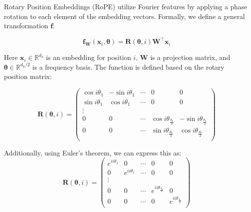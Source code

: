 \documentclass{article}
\begin{document}
Rotary Position Embeddings (RoPE) \citep{su2024roformer} utilize Fourier features by applying a phase rotation to each element of the embedding vectors. Formally, we define a general transformation $\mathbf{f}$:


\begin{equation}
\mathbf{f}_\mathbf{W}(\mathbf{x}_i, \bm{\theta}) = \mathbf{R}(\bm{\theta}, i)\mathbf{W}^\top \mathbf{x}_i
\end{equation}

Here $\mathbf{x}_i \in \mathbb{R}^{d_k}$ is an embedding for position $i$, $\mathbf{W}$ is a projection matrix, and $\bm{\theta} \in \mathbb{R}^{d_k / 2}$ is a frequency basis. The function is defined based on the rotary position matrix: 

\begin{equation}
\mathbf{R}(\bm{\theta},i)= \begin{pmatrix}
\cos i\theta_1 & - \sin i\theta_1 &  \cdots & 0 & 0 \\
\sin i\theta_1 & \cos i\theta_1 & \cdots & 0 & 0 \\
\vdots \\ 
0 & 0 &  \cdots & \cos i\theta_\frac{d_k}{2}  & - \sin i\theta_\frac{d_k}{2}  \\
0 & 0 &  \cdots & \sin i\theta_\frac{d_k}{2}  & \cos i\theta_\frac{d_k}{2}  \\
\end{pmatrix}
\end{equation}

Additionally, using Euler's theorem, we can express this as:
\begin{equation}
\mathbf{R}(\bm{\theta},i)= \begin{pmatrix}
e^{i i\theta_1} & 0 &  \cdots & 0 & 0 \\
0 & e^{i i\theta_1} & \cdots & 0 & 0 \\
\vdots \\ 
0 & 0 &  \cdots & e^{i i\theta_\frac{d_k}{2}}  & 0 \\
0 & 0 &  \cdots & 0  & e^{i i\theta_\frac{d_k}{2}}  \\
\end{pmatrix}
\end{equation}
\end{document}
